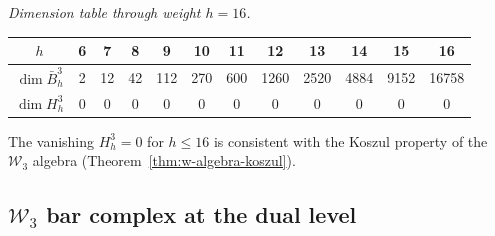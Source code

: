 \begin{computation}
\emph{Dimension table through weight $h = 16$.}
\begin{center}
\renewcommand{\arraystretch}{1.2}
\begin{tabular}{c|ccccccccccc}
$h$ & 6 & 7 & 8 & 9 & 10 & 11 & 12 & 13 & 14 & 15 & 16 \\
\hline
$\dim \bar{B}^3_h$ & 2 & 12 & 42 & 112 & 270 & 600 & 1260 & 2520 & 4884 & 9152 & 16758 \\
$\dim H^3_h$ & 0 & 0 & 0 & 0 & 0 & 0 & 0 & 0 & 0 & 0 & 0
\end{tabular}
\end{center}
The vanishing $H^3_h = 0$ for $h \leq 16$ is consistent with the
Koszul property of the $\mathcal{W}_3$ algebra
(Theorem~\ref{thm:w-algebra-koszul}).
\end{computation}


\subsection{\texorpdfstring{$\mathcal{W}_3$ bar complex at the dual level}{W3 bar complex at the dual level}}
\label{sec:w3-dual-level-bar}

